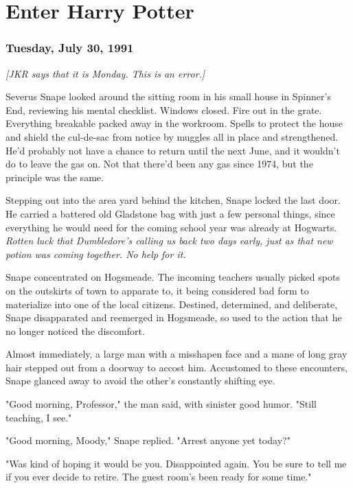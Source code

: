 
\chapter{Enter Harry Potter}

\subsection{Tuesday, July 30, 1991}\emph{[JKR says that it is Monday. This is an error.]}

Severus Snape looked around the sitting room in his small house in Spinner's End, reviewing his mental checklist. Windows closed. Fire out in the grate. Everything breakable packed away in the workroom. Spells to protect the house and shield the cul-de-sac from notice by muggles all in place and strengthened. He'd probably not have a chance to return until the next June, and it wouldn't do to leave the gas on. Not that there'd been any gas since 1974, but the principle was the same.

Stepping out into the area yard behind the kitchen, Snape locked the last door. He carried a battered old Gladstone bag with just a few personal things, since everything he would need for the coming school year was already at Hogwarts. \emph{Rotten luck that Dumbledore's calling us back two days early, just as that new potion was coming together. No help for it.}

Snape concentrated on Hogsmeade. The incoming teachers usually picked spots on the outskirts of town to apparate to, it being considered bad form to materialize into one of the local citizens. Destined, determined, and deliberate, Snape disapparated and reemerged in Hogsmeade, so used to the action that he no longer noticed the discomfort.

Almost immediately, a large man with a misshapen face and a mane of long gray hair stepped out from a doorway to accost him. Accustomed to these encounters, Snape glanced away to avoid the other's constantly shifting eye.

"Good morning, Professor," the man said, with sinister good humor. "Still teaching, I see."

"Good morning, Moody," Snape replied. "Arrest anyone yet today?"

"Was kind of hoping it would be you. Disappointed again. You be sure to tell me if you ever decide to retire. The guest room's been ready for some time."

